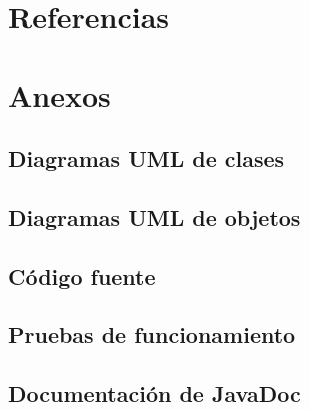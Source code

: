 \documentclass[12pt]{article}
\begin{document}
  \section*{Referencias}


  \section*{Anexos}
  \subsection*{Diagramas UML de clases}


  \subsection*{Diagramas UML de objetos}


  \subsection*{Código fuente}


  \subsection*{Pruebas de funcionamiento}


  \subsection*{Documentación de JavaDoc}
\end{document}
